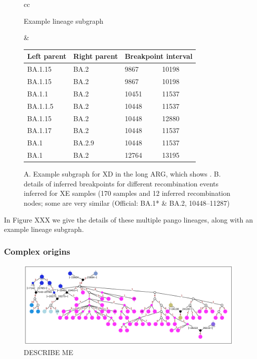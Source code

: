 \documentclass{article}
\begin{document}
\begin{figure}
\begin{tabular}{cc}

Example lineage subgraph

 &

\begin{tabular}{llll}
\toprule
Left parent & Right parent & \multicolumn{2}{l}{Breakpoint interval}\\
\midrule
BA.1.15 & BA.2  &9867  &10198\\
BA.1.15 & BA.2  &9867  &10198\\
BA.1.1  &BA.2  &10451  &11537\\
BA.1.1.5 & BA.2 &10448 & 11537\\
BA.1.15 & BA.2  &10448  &12880\\
BA.1.17 & BA.2  &10448 & 11537\\
BA.1  &BA.2.9  &10448 & 11537\\
BA.1  &BA.2  &12764  &13195\\
\bottomrule
\end{tabular}
\end{tabular}
\caption{A. Example subgraph for XD in the long ARG, which shows . B. details of inferred breakpoints for different recombination events inferred for XE samples (170 samples and 12 inferred recombination nodes; some are very similar (Official: BA.1* \& BA.2, 10448–11287)}
\end{figure}

In Figure XXX we give the details of these multiple pango lineages, along with an example lineage subgraph.


\subsubsection{Complex origins}
\begin{figure} \centering
\includegraphics[width=\textwidth]{figures/Pango_XB_nxcld_tight_graph.pdf}
\caption{\label{fig:complex_origins_graph}  DESCRIBE ME}
\end{figure}
\end{document}
